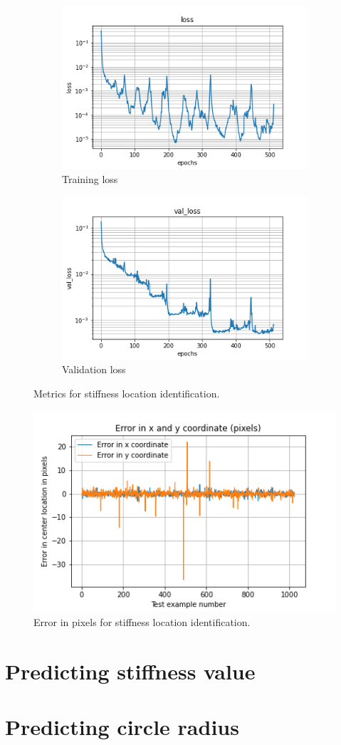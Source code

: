 \documentclass{article}
\begin{document}
%
\begin{figure}
\centering
\begin{subfigure}[b]{0.45\textwidth}
    \centering
    \includegraphics[totalheight=4cm]{circle_id/location/plotloss.png}
    \caption{Training loss}
  \end{subfigure}
%
\begin{subfigure}[b]{0.45\textwidth}
    \centering
    \includegraphics[totalheight=4cm]{circle_id/location/plotval_loss.png}
    \caption{Validation loss}
  \end{subfigure}
%
\caption{\label{fig:locationmetrics} Metrics for stiffness location identification.}
\end{figure}
%
\begin{figure}
\centering
\includegraphics{circle_id/location/plotabserror.png}
\caption{\label{fig:locationerror} Error in pixels for stiffness location identification.}
\end{figure}
%
\section{Predicting stiffness value}
%
\section{Predicting circle radius}
%
\end{document}
